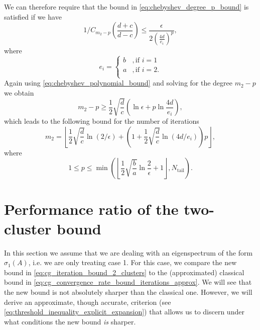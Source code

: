 We can therefore require that the bound in \cref{eq:chebyshev_degree_p_bound} is satisfied if we have
\[
    1/C_{m_2-p}\left(\frac{d+c}{d-c}\right) \leq \frac{\epsilon}{2\left( \frac{4d}{e_i}\right)^p},
\]
where 
\[
    e_i = \begin{cases}
        b &, \text{if } i = 1\\
        a &, \text{if } i = 2.\\
    \end{cases}
\]
Again using \cref{eq:chebyshev_polynomial_bound} and solving for the degree $m_2 - p$ we obtain
\[
    m_2 - p \geq \frac{1}{2}\sqrt{\frac{d}{c}}\left(\ln{\epsilon} + p \ln{\frac{4d}{e_i}}\right),
\]
which leads to the following bound for the number of iterations \cite[Equation 4.4]{cg_sharpened_convrate_Axelsson1976}
\begin{equation}
    m_2=\left\lfloor\frac{1}{2} \sqrt{\frac{d}{c}} \ln (2 / \epsilon)+\left(1+\frac{1}{2} \sqrt{\frac{d}{c}} \ln (4 d / e_i)\right) p\right\rfloor,
    \label{eq:cg_iteration_bound_2_clusters}
\end{equation}
where 
\[
    1 \leq p \leq \min\left(\left\lfloor\frac{1}{2}\sqrt{\frac{b}{a}}\ln{\frac{2}{\epsilon}} + 1 \right\rfloor, N_{\text{tail}}\right).
\]

\section{Performance ratio of the two-cluster bound}\label{sec:performance_ratio}
In this section we assume that we are dealing with an eigenspectrum of the form $\sigma_1(A)$, i.e. we are only treating case 1. For this case, we compare the new bound in \cref{eq:cg_iteration_bound_2_clusters} to the (approximated) classical bound in \cref{eq:cg_convergence_rate_bound_iterations_approx}. We will see that the new bound is not absolutely sharper than the classical one. However, we will derive an approximate, though accurate, criterion (see \cref{eq:threshold_inequality_explicit_expansion}) that allows us to discern under what conditions the new bound \textit{is} sharper.

